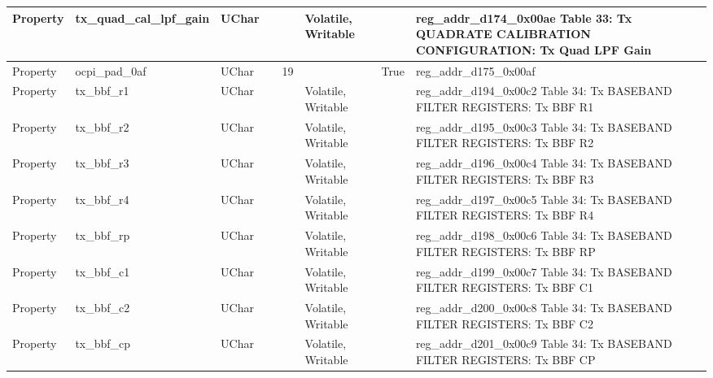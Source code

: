 \documentclass{article}
\begin{document}
\begin{scriptsize}
\begin{longtable}{|p{2cm}|p{5cm}|p{1cm}|p{2cm}|p{2cm}|p{1.75cm}|p{1.5cm}|p{5.1cm}|}
  \hline
  Property & tx\_quad\_cal\_lpf\_gain                                 & UChar &                  &                  & Volatile,  Writable &         & reg\_addr\_d174\_0x00ae Table 33: Tx QUADRATE CALIBRATION CONFIGURATION: Tx Quad LPF Gain \\
  \hline
  Property & ocpi\_pad\_0af                                           & UChar &                  & 19               &                     & True    & reg\_addr\_d175\_0x00af \\
  \hline
  Property & tx\_bbf\_r1                                              & UChar &                  &                  & Volatile,  Writable &         & reg\_addr\_d194\_0x00c2 Table 34: Tx BASEBAND FILTER REGISTERS: Tx BBF R1 \\
  \hline
  Property & tx\_bbf\_r2                                              & UChar &                  &                  & Volatile,  Writable &         & reg\_addr\_d195\_0x00c3 Table 34: Tx BASEBAND FILTER REGISTERS: Tx BBF R2 \\
  \hline
  Property & tx\_bbf\_r3                                              & UChar &                  &                  & Volatile,  Writable &         & reg\_addr\_d196\_0x00c4 Table 34: Tx BASEBAND FILTER REGISTERS: Tx BBF R3 \\
  \hline
  Property & tx\_bbf\_r4                                              & UChar &                  &                  & Volatile,  Writable &         & reg\_addr\_d197\_0x00c5 Table 34: Tx BASEBAND FILTER REGISTERS: Tx BBF R4 \\
  \hline
  Property & tx\_bbf\_rp                                              & UChar &                  &                  & Volatile,  Writable &         & reg\_addr\_d198\_0x00c6 Table 34: Tx BASEBAND FILTER REGISTERS: Tx BBF RP \\
  \hline
  Property & tx\_bbf\_c1                                              & UChar &                  &                  & Volatile,  Writable &         & reg\_addr\_d199\_0x00c7 Table 34: Tx BASEBAND FILTER REGISTERS: Tx BBF C1 \\
  \hline
  Property & tx\_bbf\_c2                                              & UChar &                  &                  & Volatile,  Writable &         & reg\_addr\_d200\_0x00c8 Table 34: Tx BASEBAND FILTER REGISTERS: Tx BBF C2 \\
  \hline
  Property & tx\_bbf\_cp                                              & UChar &                  &                  & Volatile,  Writable &         & reg\_addr\_d201\_0x00c9 Table 34: Tx BASEBAND FILTER REGISTERS: Tx BBF CP \\

\end{longtable}
\end{scriptsize}
\end{document}
